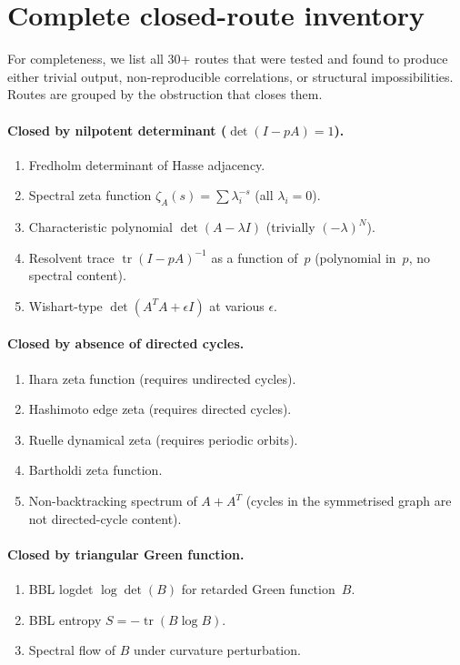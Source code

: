 \documentclass[12pt,a4paper]{article}
\theoremstyle{plain}
\theoremstyle{definition}
\theoremstyle{remark}
\newcommand{\tr}{\operatorname{tr}}
\begin{document}
\section{Complete closed-route inventory}
\label{app:routes}

For completeness, we list all 30+ routes that were tested and
found to produce either trivial output, non-reproducible
correlations, or structural impossibilities.  Routes are
grouped by the obstruction that closes them.

\paragraph{Closed by nilpotent determinant
($\det(I - pA) = 1$).}
\begin{enumerate}
\item Fredholm determinant of Hasse adjacency.
\item Spectral zeta function $\zeta_A(s) = \sum \lambda_i^{-s}$
  (all $\lambda_i = 0$).
\item Characteristic polynomial $\det(A - \lambda I)$
  (trivially $(-\lambda)^N$).
\item Resolvent trace $\tr(I - pA)^{-1}$ as a function of~$p$
  (polynomial in~$p$, no spectral content).
\item Wishart-type $\det(A^T A + \epsilon I)$ at various
  $\epsilon$.
\end{enumerate}

\paragraph{Closed by absence of directed cycles.}
\begin{enumerate}[resume]
\item Ihara zeta function (requires undirected cycles).
\item Hashimoto edge zeta (requires directed cycles).
\item Ruelle dynamical zeta (requires periodic orbits).
\item Bartholdi zeta function.
\item Non-backtracking spectrum of $A + A^T$ (cycles in the
  symmetrised graph are not directed-cycle content).
\end{enumerate}

\paragraph{Closed by triangular Green function.}
\begin{enumerate}[resume]
\item BBL logdet $\log\det(B)$ for retarded Green function~$B$.
\item BBL entropy $S = -\tr(B \log B)$.
\item Spectral flow of $B$ under curvature perturbation.
\end{enumerate}
\end{document}
